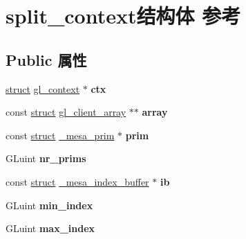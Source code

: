 \hypertarget{structsplit__context}{}\section{split\+\_\+context结构体 参考}
\label{structsplit__context}
\subsection*{Public 属性}
\begin{DoxyCompactItemize}
\item 
\mbox{\label{structsplit__context_ae450afcd5401de8e22ccd26f2497b359}} 
\hyperlink{interfacestruct}{struct} \hyperlink{structgl__context}{gl\+\_\+context} $\ast$ {\bfseries ctx}
\item 
\mbox{\label{structsplit__context_a6450751c15fe37caea2cbfcaa929c53d}} 
const \hyperlink{interfacestruct}{struct} \hyperlink{structgl__client__array}{gl\+\_\+client\+\_\+array} $\ast$$\ast$ {\bfseries array}
\item 
\mbox{\label{structsplit__context_a226ff90619f62e4c7b078473dd334928}} 
const \hyperlink{interfacestruct}{struct} \hyperlink{struct__mesa__prim}{\+\_\+mesa\+\_\+prim} $\ast$ {\bfseries prim}
\item 
\mbox{\label{structsplit__context_aa09ca98f98638a447ed9b44b71abd675}} 
G\+Luint {\bfseries nr\+\_\+prims}
\item 
\mbox{\label{structsplit__context_a2a70c833248549d51d3999284b0ee66a}} 
const \hyperlink{interfacestruct}{struct} \hyperlink{struct__mesa__index__buffer}{\+\_\+mesa\+\_\+index\+\_\+buffer} $\ast$ {\bfseries ib}
\item 
\mbox{\label{structsplit__context_a8d1e40dd51d581e4548480b46a645560}} 
G\+Luint {\bfseries min\+\_\+index}
\item 
\mbox{\label{structsplit__context_a93fee317f4ed0695f4f77aad6f9019d3}} 
G\+Luint {\bfseries max\+\_\+index}
\item 
\mbox{\label{structsplit__context_a581c9980bcf497469530834ab7534eb0}} 
$$
\end{DoxyCompactItemize}
